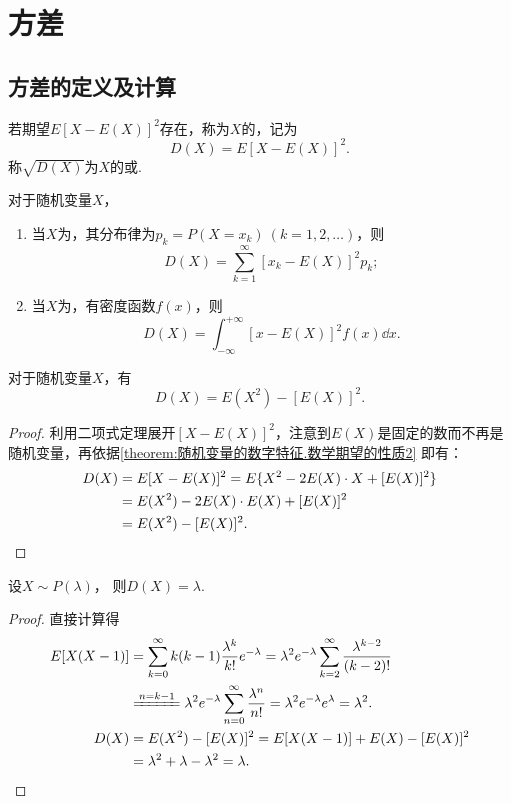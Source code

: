 \section{方差}
\subsection{方差的定义及计算}
\begin{definition}
若期望\(E[X-E(X)]^2\)存在，称为\(X\)的，记为\[
D(X) = E[X-E(X)]^2.
\]称\(\sqrt{D(X)}\)为\(X\)的或.
\end{definition}

\begin{theorem}
对于随机变量\(X\)，
\begin{enumerate}
\item 当\(X\)为，其分布律为\(p_k = P(X=x_k)\ (k=1,2,\dotsc)\)，则\[
D(X) = \sum_{k=1}^\infty [x_k - E(X)]^2 p_k;
\]
\item 当\(X\)为，有密度函数\(f(x)\)，则\[
D(X) = \int_{-\infty}^{+\infty} [x - E(X)]^2 f(x) \dd{x}.
\]
\end{enumerate}
\end{theorem}

\begin{corollary}\label{theorem:随机变量的数字特征.常用的方差的计算式}
对于随机变量\(X\)，有\begin{equation}
D(X) = E(X^2) - [E(X)]^2.
\end{equation}
\begin{proof}
利用二项式定理展开\([X-E(X)]^2\)，注意到\(E(X)\)是固定的数而不再是随机变量，再依据\cref{theorem:随机变量的数字特征.数学期望的性质2} 即有：
\begin{align*}
D(X) &= E[X-E(X)]^2
= E\{X^2 - 2E(X) \cdot X + [E(X)]^2\} \\
&= E(X^2) - 2E(X) \cdot E(X) + [E(X)]^2 \\
&= E(X^2) - [E(X)]^2.
\qedhere
\end{align*}
\end{proof}
\end{corollary}

\begin{proposition}
设\(X \sim P(\lambda)\)，
则\(D(X) = \lambda\).
\begin{proof}
直接计算得\begin{align*}
	E[X(X-1)]
	&= \sum_{k=0}^\infty {k(k-1) \frac{\lambda^k}{k!} e^{-\lambda}}
	= \lambda^2 e^{-\lambda} \sum_{k=2}^\infty {\frac{\lambda^{k-2}}{(k-2)!}} \\
	&\xlongequal{n=k-1} \lambda^2 e^{-\lambda} \sum_{n=0}^\infty {\frac{\lambda^n}{n!}}
	= \lambda^2 e^{-\lambda} e^\lambda = \lambda^2. \\
	D(X)
	&= E(X^2) - [E(X)]^2
	= E[X(X-1)] + E(X) - [E(X)]^2 \\
	&= \lambda^2 + \lambda - \lambda^2 = \lambda.
	\qedhere
\end{align*}
\end{proof}
\end{proposition}

